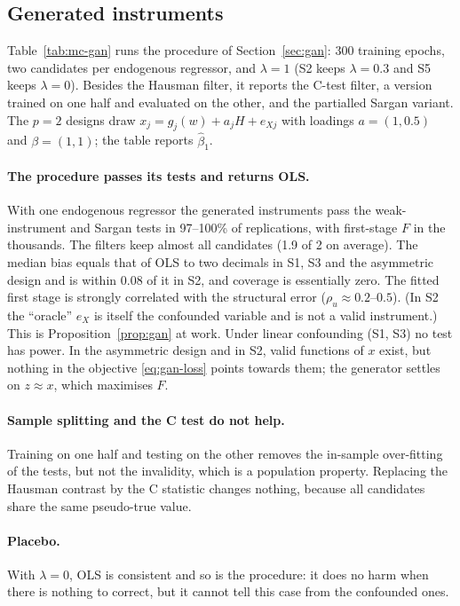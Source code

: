 \documentclass[11pt]{article}
\theoremstyle{definition}
\theoremstyle{remark}
\begin{document}
\subsection{Generated instruments}\label{sec:gan-mc}

Table~\ref{tab:mc-gan} runs the procedure of Section~\ref{sec:gan}: 300 training epochs, two
candidates per endogenous regressor, and $\lambda=1$ (S2 keeps $\lambda=0.3$ and S5 keeps
$\lambda=0$). Besides the Hausman filter, it reports the C-test filter, a version trained on one half
and evaluated on the other, and the partialled Sargan variant. The $p=2$ designs draw
$x_j = g_j(w)+a_jH+e_{Xj}$ with loadings $a=(1,0.5)$ and $\beta=(1,1)$; the table reports
$\hat\beta_1$.



\paragraph{The procedure passes its tests and returns OLS.} With one endogenous regressor the
generated instruments pass the weak-instrument and Sargan tests in 97--100\% of replications, with
first-stage $F$ in the thousands. The filters keep almost all candidates (1.9 of 2 on average).
The median bias equals that of OLS to two decimals in S1, S3 and the asymmetric design and is within
$0.08$ of it in S2, and coverage is essentially zero. The fitted first stage is strongly correlated
with the structural error ($\rho_u\approx0.2$--$0.5$). (In S2 the ``oracle'' $e_X$ is itself the
confounded variable and is not a valid instrument.)
This is Proposition~\ref{prop:gan} at work. Under linear confounding (S1, S3) no test has power.
In the asymmetric design and in S2, valid functions of $x$ exist, but nothing in the objective
\eqref{eq:gan-loss} points towards them; the generator settles on $z\approx x$, which maximises $F$.

\paragraph{Sample splitting and the C test do not help.} Training on one half and testing on the
other removes the in-sample over-fitting of the tests, but not the invalidity, which is a population
property. Replacing the Hausman contrast by the C statistic changes nothing, because all candidates
share the same pseudo-true value.

\paragraph{Placebo.} With $\lambda=0$, OLS is consistent and so is the procedure: it does no harm
when there is nothing to correct, but it cannot tell this case from the confounded ones.
\end{document}

